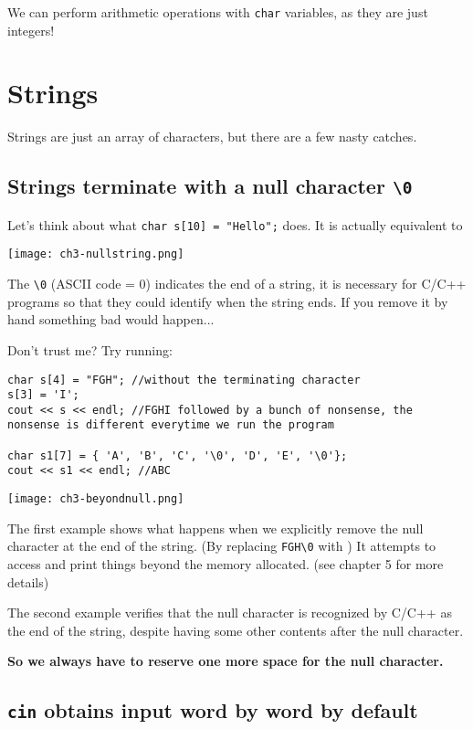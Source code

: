 We can perform arithmetic operations with \texttt{char} variables, as they are just integers! 

\section{Strings}

Strings are just an array of characters, but there are a few nasty catches.

\subsection*{Strings terminate with a null character \texttt{\textbackslash 0}}

Let's think about what \texttt{char s[10] = "Hello";} does. It is actually equivalent to 

\texttt{[image: ch3-nullstring.png]}

The \texttt{\textbackslash 0} (ASCII code = 0) indicates the end of a string, it is necessary for C/C++ programs so that they could identify when the string ends. If you remove it by hand something bad would happen...

Don't trust me? Try running:

\begin{lstlisting}
char s[4] = "FGH"; //without the terminating character
s[3] = 'I';
cout << s << endl; //FGHI followed by a bunch of nonsense, the nonsense is different everytime we run the program

char s1[7] = { 'A', 'B', 'C', '\0', 'D', 'E', '\0'};
cout << s1 << endl; //ABC
\end{lstlisting}

\texttt{[image: ch3-beyondnull.png]}

The first example shows what happens when we explicitly remove the null character at the end of the string. (By replacing \texttt{FGH\textbackslash 0} with ) It attempts to access and print things beyond the memory allocated. (see chapter 5 for more details)

The second example verifies that the null character is recognized by C/C++ as the end of the string, despite having some other contents after the null character.

\textbf{So we always have to reserve one more space for the null character.}

\subsection*{\texttt{cin} obtains input word by word by default}

